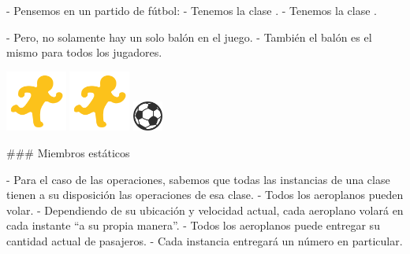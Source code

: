 
\columnsbegin
{}

- Pensemos en un partido de fútbol:
    - Tenemos la clase .
    - Tenemos la clase .

- Pero, no solamente hay un solo balón en el juego.
    - También el balón es el mismo para todos los jugadores.

\centering\includegraphics[width=20mm]{icons/321-emoji_android_runner.png}
\centering\includegraphics[width=20mm]{icons/321-emoji_android_runner.png}\newline
\centering\includegraphics[width=10mm]{icons/78-emoji_android_soccer_ball.png}
\columnsend




### Miembros estáticos


- Para el caso de las operaciones, sabemos que todas las instancias de una clase
tienen a su disposición las operaciones de esa clase.
    - Todos los aeroplanos pueden volar.
        - Dependiendo de su ubicación y velocidad actual, cada aeroplano volará en cada instante
        ``a su propia manera''.
    - Todos los aeroplanos puede entregar su cantidad actual de pasajeros.
        - Cada instancia entregará un número en particular.

\vfill

